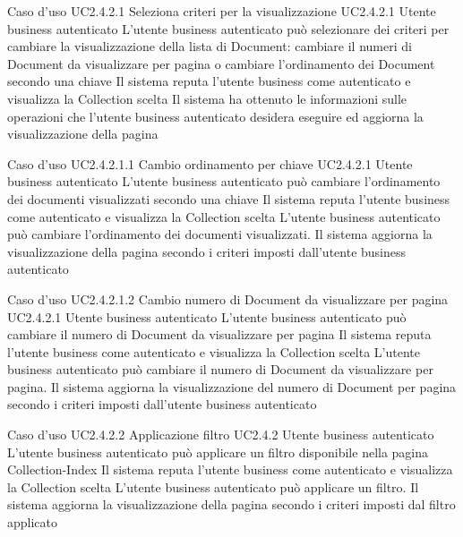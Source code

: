\UCtitle
{Caso d'uso UC2.4.2.1}
{Seleziona criteri per la visualizzazione}
\UC
{UC2.4.2.1}
{Utente business autenticato}
{L'utente business autenticato può selezionare dei criteri per cambiare la visualizzazione della lista di Document: cambiare il numeri di Document da visualizzare per pagina o cambiare l'ordinamento dei Document secondo una chiave}
{Il sistema reputa l'utente business come autenticato e visualizza la Collection scelta}
\post
{Il sistema ha ottenuto le informazioni sulle operazioni che l'utente business autenticato desidera eseguire ed aggiorna la visualizzazione della pagina}


\UCtitle
{Caso d'uso UC2.4.2.1.1}
{Cambio ordinamento per chiave}
\UC
{UC2.4.2.1}
{Utente business autenticato}
{L'utente business autenticato può cambiare l'ordinamento dei documenti visualizzati secondo una chiave}
{Il sistema reputa l'utente business come autenticato e visualizza la Collection scelta}
\scenario
{L'utente business autenticato può cambiare l'ordinamento dei documenti visualizzati.}
\post
{Il sistema aggiorna la visualizzazione della pagina secondo i criteri imposti dall'utente business autenticato}


\UCtitle
{Caso d'uso UC2.4.2.1.2}
{Cambio numero di Document da visualizzare per pagina}
\UC
{UC2.4.2.1}
{Utente business autenticato}
{L'utente business autenticato può cambiare il numero di Document da visualizzare per pagina}
{Il sistema reputa l'utente business come autenticato e visualizza la Collection scelta}
\scenario
{L'utente business autenticato può cambiare il numero di Document da visualizzare per pagina.}
\post
{Il sistema aggiorna la visualizzazione del numero di Document per pagina secondo i criteri imposti dall'utente business autenticato}

\UCtitle
{Caso d'uso UC2.4.2.2}
{Applicazione filtro}
\UC
{UC2.4.2}
{Utente business autenticato}
{L'utente business autenticato può applicare un filtro disponibile nella pagina Collection-Index}
{Il sistema reputa l'utente business come autenticato e visualizza la Collection scelta}
\scenario
{L'utente business autenticato può applicare un filtro.}
\post
{Il sistema aggiorna la visualizzazione della pagina secondo i criteri imposti dal filtro applicato}


